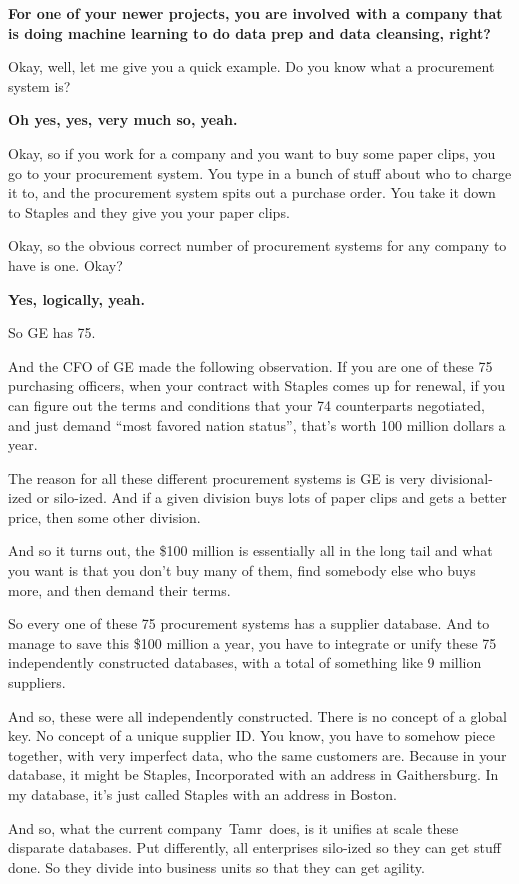 \documentclass[a4paper,12pt,notitlepage,twoside,openright]{article}
\begin{document}
\textbf{For one of your newer projects, you are involved with a company
that is doing machine learning to do data prep and data cleansing,
right?}

Okay, well, let me give you a quick example. Do you know what a
procurement system is?

\textbf{Oh yes, yes, very much so, yeah.}

Okay, so if you work for a company and you want to buy some paper clips,
you go to your procurement system. You type in a bunch of stuff about
who to charge it to, and the procurement system spits out a purchase
order. You take it down to Staples and they give you your paper clips.

Okay, so the obvious correct number of procurement systems for any
company to have is one. Okay?

\textbf{Yes, logically, yeah.}

So GE has 75.

And the CFO of GE made the following observation. If you are one of
these 75 purchasing officers, when your contract with Staples comes up
for renewal, if you can figure out the terms and conditions that your 74
counterparts negotiated, and just demand ``most favored nation status'',
that's worth 100 million dollars a year.

The reason for all these different procurement systems is GE is very
divisional-ized or silo-ized. And if a given division buys lots of paper
clips and gets a better price, then some other division.

And so it turns out, the \$100 million is essentially all in the long
tail and what you want is that you don't buy many of them, find somebody
else who buys more, and then demand their terms.

So every one of these 75 procurement systems has a supplier database.
And to manage to save this \$100 million a year, you have to integrate
or unify these 75 independently constructed databases, with a total of
something like 9 million suppliers.

And so, these were all independently constructed. There is no concept of
a global key. No concept of a unique supplier ID. You know, you have to
somehow piece together, with very imperfect data, who the same customers
are. Because in your database, it might be Staples, Incorporated with an
address in Gaithersburg. In my database, it's just called Staples with
an address in Boston.

And so, what the current company~{Tamr}~does, is it unifies at scale
these disparate databases. Put differently, all enterprises silo-ized so
they can get stuff done. So they divide into business units so that they
can get agility.
\end{document}
